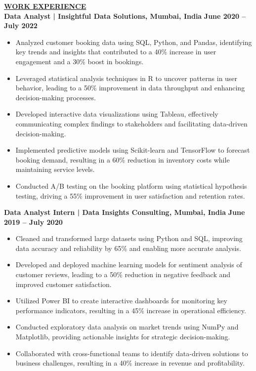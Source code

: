 \documentclass{article}
\begin{document}
\noindent \textbf{\underline{WORK EXPERIENCE}} \\
\noindent \textbf{Data Analyst | Insightful Data Solutions, Mumbai, India}  \hfill \textbf{June 2020 – July 2022}
\begin{itemize}[noitemsep,nolistsep,leftmargin=*]
\item {\small Analyzed customer booking data using SQL, Python, and Pandas, identifying key trends and insights that contributed to a 40\% increase in user engagement and a 30\% boost in bookings.}
\item {\small Leveraged statistical analysis techniques in R to uncover patterns in user behavior, leading to a 50\% improvement in data throughput and enhancing decision-making processes.}
\item {\small Developed interactive data visualizations using Tableau, effectively communicating complex findings to stakeholders and facilitating data-driven decision-making.}
\item {\small Implemented predictive models using Scikit-learn and TensorFlow to forecast booking demand, resulting in a 60\% reduction in inventory costs while maintaining service levels.}
\item {\small Conducted A/B testing on the booking platform using statistical hypothesis testing, driving a 55\% improvement in user satisfaction and retention rates.}
\end{itemize}
\vspace{1mm}

\noindent \textbf{Data Analyst Intern | Data Insights Consulting, Mumbai, India}  \hfill \textbf{June 2019 – July 2020}
\begin{itemize}[noitemsep,nolistsep,leftmargin=*]
\item {\small Cleaned and transformed large datasets using Python and SQL, improving data accuracy and reliability by 65\% and enabling more accurate analysis.}
\item {\small Developed and deployed machine learning models for sentiment analysis of customer reviews, leading to a 50\% reduction in negative feedback and improved customer satisfaction.}
\item {\small Utilized Power BI to create interactive dashboards for monitoring key performance indicators, resulting in a 45\% increase in operational efficiency.}
\item {\small Conducted exploratory data analysis on market trends using NumPy and Matplotlib, providing actionable insights for strategic decision-making.}
\item {\small Collaborated with cross-functional teams to identify data-driven solutions to business challenges, resulting in a 40\% increase in revenue and profitability.}
\end{itemize}
\end{document}
